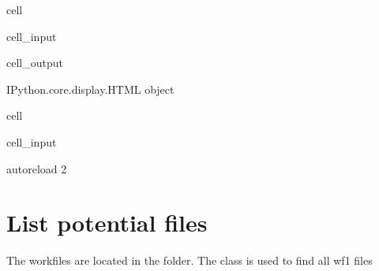 \documentclass[letterpaper,10pt,english]{jupyterBook}
\begin{document}
\begin{sphinxuseclass}{cell}\begin{sphinxVerbatimInput}

\begin{sphinxuseclass}{cell_input}
\begin{sphinxVerbatim}[commandchars=\\\{\}]
   

    
   
\end{sphinxVerbatim}

\end{sphinxuseclass}\end{sphinxVerbatimInput}
\begin{sphinxVerbatimOutput}

\begin{sphinxuseclass}{cell_output}
\begin{sphinxVerbatim}[commandchars=\\\{\}]
\PYGZlt{}IPython.core.display.HTML object\PYGZgt{}
\end{sphinxVerbatim}

\end{sphinxuseclass}\end{sphinxVerbatimOutput}

\end{sphinxuseclass}
\begin{sphinxuseclass}{cell}\begin{sphinxVerbatimInput}

\begin{sphinxuseclass}{cell_input}
\begin{sphinxVerbatim}[commandchars=\\\{\}]
  autoreload
  2
\end{sphinxVerbatim}

\end{sphinxuseclass}\end{sphinxVerbatimInput}

\end{sphinxuseclass}

\section{List potential files}
\label{\detokenize{content/howto/onboard/eviews/onboard many models from wf1:list-potential-files}}
\sphinxAtStartPar
The workfiles are located in the  folder. 
The  class is used to find all wf1 files
\end{document}
